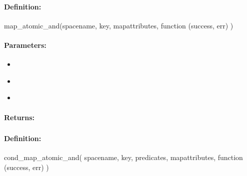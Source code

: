 \paragraph{Definition:}
\begin{javascriptcode}
map_atomic_and(spacename, key, mapattributes, function (success, err) {})
\end{javascriptcode}
\paragraph{Parameters:}
\begin{itemize}[noitemsep]
\item {}\\

\item {}\\

\item {}\\

\end{itemize}

\paragraph{Returns:}


\pagebreak
\subsubsection{}
\label{api:nodejs:cond_map_atomic_and}


\paragraph{Definition:}
\begin{javascriptcode}
cond_map_atomic_and(
        spacename, key, predicates, mapattributes, function (success, err) {})
\end{javascriptcode}

